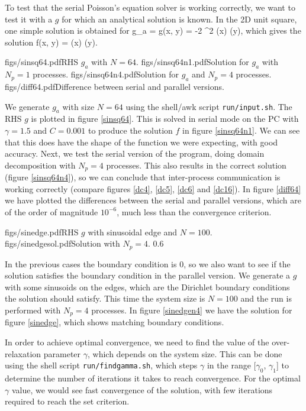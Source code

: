 \documentclass[10pt]{article}
\begin{document}
To test that the serial Poisson's equation solver is working correctly, we want to test it with a $g$ for which an analytical solution is known. In the 2D unit square, one simple solution is obtained for \cite{poi}
\bna
g_a = g(x, y) = -2 \pi^2 \sin(\pi x) \sin(\pi y),
\ena
which gives the solution
\bna
f(x, y) = \sin(\pi x) \sin(\pi y).
\ena

\quadfig
{figs/sinsq64.pdf}{RHS $g_a$ with $N=64$.\label{sinsq64}}
{figs/sinsq64n1.pdf}{Solution for $g_a$ with $N_p=1$ processes.\label{sinsq64n1}}
{figs/sinsq64n4.pdf}{Solution for $g_a$ and $N_p=4$ processes.\label{sinsq64n4}}
{figs/diff64.pdf}{Difference between serial and parallel versions.\label{diff64}}

\noindent We generate $g_a$ with size $N=64$ using the shell/awk script \verb|run/input.sh|. The RHS $g$ is plotted in figure \ref{sinsq64}. This is solved in serial mode on the PC with $\gamma=1.5$ and $C=0.001$ to produce the solution $f$ in figure \ref{sinsq64n1}. We can see that this does have the shape of the function we were expecting, with good accuracy. Next, we test the serial version of the program, doing domain decomposition with $N_p=4$ processes. This also results in the correct solution (figure \ref{sinsq64n4}), so we can conclude that inter-process communication is working correctly (compare figures \ref{dc4},  \ref{dc5}, \ref{dc6} and \ref{dc16}). In figure \ref{diff64} we have plotted the differences between the serial and parallel versions, which are of the order of magnitude $10^{-6}$, much less than the convergence criterion. 

\dualfigs
{figs/sinedge.pdf}{RHS $g$ with sinusoidal edge and $N=100$.\label{sinedge}}
{figs/sinedgesol.pdf}{Solution with $N_p = 4$.\label{sinedgen4}}
{0.6}

In the previous cases the boundary condition is 0, so we also want to see if the solution satisfies the boundary condition in the parallel version. We generate a $g$ with some sinusoids on the edges, which are the Dirichlet boundary conditions the solution should satisfy. This time the system size is $N=100$ and the run is performed with $N_p = 4$ processes. In figure \ref{sinedgen4} we have the solution for figure \ref{sinedge}, which shows matching boundary conditions.


In order to achieve optimal convergence, we need to find the value of the over-relaxation parameter $\gamma$, which depends on the system size. This can be done using the shell script \verb|run/findgamma.sh|, which steps $\gamma$ in the range [$\gamma_0$, $\gamma_1$] to determine the number of iterations it takes to reach convergence. For the optimal $\gamma$ value, we would see fast convergence of the solution, with few iterations required to reach the set criterion.
\end{document}
